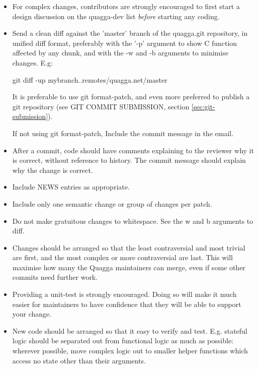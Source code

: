 \documentclass[oneside]{article}
\begin{document}
\begin{itemize}

\item For complex changes, contributors are strongly encouraged to first
      start a design discussion on the quagga-dev list \emph{before}
      starting any coding.

\item Send a clean diff against the 'master' branch of the quagga.git
      repository, in unified diff format, preferably with the '-p' argument to
      show C function affected by any chunk, and with the -w and -b arguments to
      minimise changes. E.g:

     git diff -up mybranch..remotes/quagga.net/master

     It is preferable to use git format-patch, and even more preferred to
     publish a git repository (see GIT COMMIT SUBMISSION, section
     \ref{sec:git-submission}).

     If not using git format-patch, Include the commit message in the email.

\item After a commit, code should have comments explaining to the reviewer
      why it is correct, without reference to history.  The commit message
      should explain why the change is correct.

\item Include NEWS entries as appropriate.

\item Include only one semantic change or group of changes per patch.

\item Do not make gratuitous changes to whitespace. See the w and b arguments
      to diff.

\item Changes should be arranged so that the least contraversial and most
      trivial are first, and the most complex or more contraversial are
      last.  This will maximise how many the Quagga maintainers can merge,
      even if some other commits need further work.

\item Providing a unit-test is strongly encouraged. Doing so will make it
      much easier for maintainers to have confidence that they will be able
      to support your change.

\item New code should be arranged so that it easy to verify and test. E.g. 
      stateful logic should be separated out from functional logic as much as
      possible: wherever possible, move complex logic out to smaller helper
      functions which access no state other than their arguments.


\end{itemize}
\end{document}
